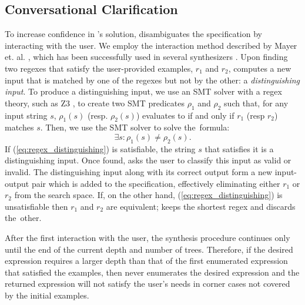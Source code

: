 \subsection{Conversational Clarification}\label{sec:interaction-cc}

To increase confidence in \Forest{}'s solution, \Forest{} disambiguates the specification by interacting with the user. %
We employ the interaction method described by Mayer et. al. \cite{DBLP:conf/uist/MayerSGLMPSZG15}, which has been successfully used in several synthesizers  \cite{DBLP:journals/pvldb/LiCM15,DBLP:conf/sigmod/WangCB17,DBLP:conf/pldi/WangCB17}.
Upon finding two regexes that satisfy the user-provided examples, \(r_1\) and \(r_2\), \Forest{} computes a new input that is matched by one of the regexes but not by the other: a \textit{distinguishing input}.     
To produce a distinguishing input, we use an \ac{SMT} solver with a regex theory, such as Z3 \cite{z3,z3str317}, to create two \ac{SMT} predicates \(\rho_{1}\) and \(\rho_{2}\) such that, for any input string \(s\), \(\rho_{1}(s)\) (resp. \(\rho_{2}(s)\)) evaluates to \true{} if and only if \(r_1\) (resp \(r_2\)) matches \(s\).
Then, we use the \ac{SMT} solver to solve the~formula:
%
\begin{equation}\label{eq:regex_distinguishing}
  \exists s: \rho_{1}(s) \neq \rho_{2}(s).
\end{equation}
%
If (\ref{eq:regex_distinguishing}) is satisfiable, the string \(s\) that satisfies it is a distinguishing input. Once found, \Forest{} asks the user to classify this input as valid or invalid.
The distinguishing input along with its correct output form a new input-output pair which is added to the specification, effectively eliminating either \(r_1\) or \(r_2\) from the search space.
If, on the other hand, (\ref{eq:regex_distinguishing}) is unsatisfiable then \(r_1\) and \(r_2\) are equivalent; \Forest{} keeps the shortest regex and discards the~other.

After the first interaction with the user, the synthesis procedure continues only until the end of the current depth and number of trees. Therefore, if the desired expression requires a larger depth than that of the first enumerated expression that satisfied the examples, then \Forest{} never enumerates the desired expression and the returned expression will not satisfy the user's needs in corner cases not covered by the initial examples.

